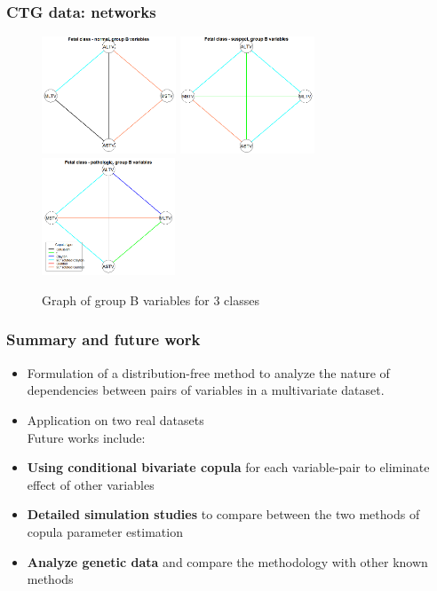 \documentclass[handout,10pt]{beamer}
\begin{document}
\begin{frame}
\frametitle{CTG data: networks}
\begin{figure}[t]
	\centering
		\includegraphics[height=3.5cm]{ctgplot_1b.png}
		\includegraphics[height=3.5cm]{ctgplot_2b.png}
		\includegraphics[height=3.5cm]{ctgplot_3b.png}
	\label{fig:fig2}
	\caption{Graph of group B variables for 3 classes}
\end{figure}
\end{frame}

\begin{frame}
\frametitle{Summary and future work}
\begin{itemize}
\item Formulation of a distribution-free method to analyze the nature of dependencies between pairs of variables in a multivariate dataset.
\item Application on two real datasets\\
\vspace{.5cm}
Future works include:
\item \textbf{Using conditional bivariate copula} for each variable-pair to eliminate effect of other variables
\item \textbf{Detailed simulation studies} to compare between the two methods of copula parameter estimation
\item \textbf{Analyze genetic data} and compare the methodology with other known methods
\end{itemize}
\end{frame}
\end{document}
